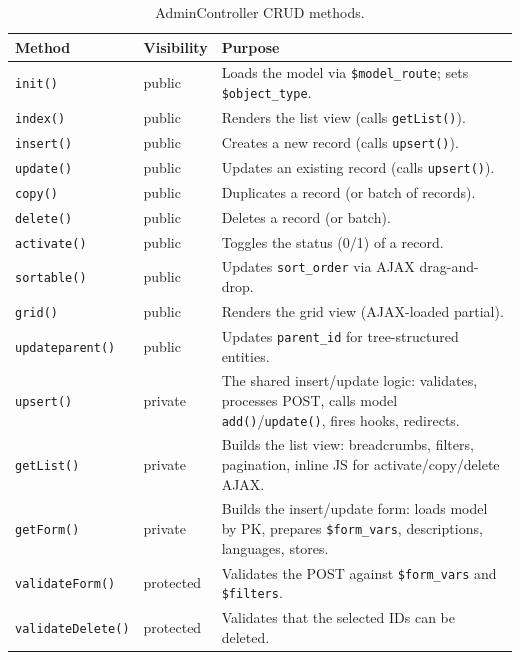 \documentclass[11pt,a4paper]{article}
\begin{document}
\begin{table}[htbp]
\centering
\caption{AdminController CRUD methods.}\label{tab:crud-methods}
\footnotesize\sloppy
\begin{tabularx}{\columnwidth}{llX}
\toprule
\textbf{Method} & \textbf{Visibility} & \textbf{Purpose} \\
\midrule
\texttt{init()}          & public    & Loads the model via \texttt{\$model\_route}; sets \texttt{\$object\_type}. \\
\texttt{index()}         & public    & Renders the list view (calls \texttt{getList()}). \\
\texttt{insert()}        & public    & Creates a new record (calls \texttt{upsert()}). \\
\texttt{update()}        & public    & Updates an existing record (calls \texttt{upsert()}). \\
\texttt{copy()}          & public    & Duplicates a record (or batch of records). \\
\texttt{delete()}        & public    & Deletes a record (or batch). \\
\texttt{activate()}      & public    & Toggles the status (0/1) of a record. \\
\texttt{sortable()}      & public    & Updates \texttt{sort\_order} via AJAX drag-and-drop. \\
\texttt{grid()}          & public    & Renders the grid view (AJAX-loaded partial). \\
\texttt{updateparent()}  & public    & Updates \texttt{parent\_id} for tree-structured entities. \\
\texttt{upsert()}        & private   & The shared insert/update logic: validates, processes POST, calls model \texttt{add()}/\texttt{update()}, fires hooks, redirects. \\
\texttt{getList()}       & private   & Builds the list view: breadcrumbs, filters, pagination, inline JS for activate/copy/delete AJAX. \\
\texttt{getForm()}       & private   & Builds the insert/update form: loads model by PK, prepares \texttt{\$form\_vars}, descriptions, languages, stores. \\
\texttt{validateForm()}  & protected & Validates the POST against \texttt{\$form\_vars} and \texttt{\$filters}. \\
\texttt{validateDelete()}& protected & Validates that the selected IDs can be deleted. \\
\bottomrule
\end{tabularx}
\end{table}
\end{document}
